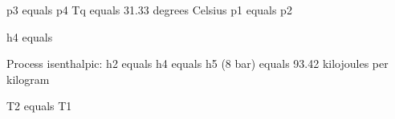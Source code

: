 p3 equals p4
Tq equals 31.33 degrees Celsius
p1 equals p2

h4 equals

Process isenthalpic:
h2 equals h4 equals h5 (8 bar) equals 93.42 kilojoules per kilogram

T2 equals T1